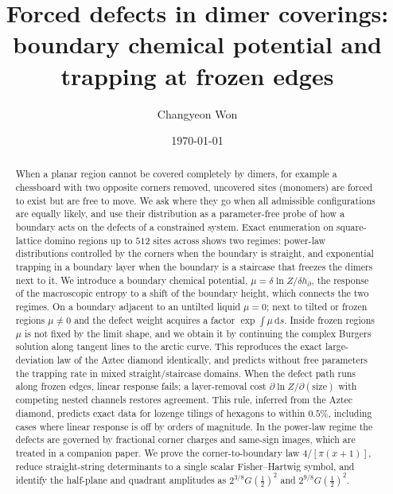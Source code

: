 \documentclass[aps,pre,twocolumn,superscriptaddress,nofootinbib,floatfix]{revtex4-2}
\newcommand{\dd}{\mathrm{d}}
\begin{document}
\title{Forced defects in dimer coverings:\\ boundary chemical potential and trapping at frozen edges}

\author{Changyeon Won}

\date{\today}

\begin{abstract}
When a planar region cannot be covered completely by dimers, for example a chessboard with two opposite corners removed, uncovered sites (monomers) are forced to exist but are free to move. We ask where they go when all admissible configurations are equally likely, and use their distribution as a parameter-free probe of how a boundary acts on the defects of a constrained system. Exact enumeration on square-lattice domino regions up to $512$ sites across shows two regimes: power-law distributions controlled by the corners when the boundary is straight, and exponential trapping in a boundary layer when the boundary is a staircase that freezes the dimers next to it. We introduce a boundary chemical potential, $\mu=\delta\ln Z/\delta h_\partial$, the response of the macroscopic entropy to a shift of the boundary height, which connects the two regimes. On a boundary adjacent to an untilted liquid $\mu=0$; next to tilted or frozen regions $\mu\neq0$ and the defect weight acquires a factor $\exp\int\mu\,\dd s$. Inside frozen regions $\mu$ is not fixed by the limit shape, and we obtain it by continuing the complex Burgers solution along tangent lines to the arctic curve. This reproduces the exact large-deviation law of the Aztec diamond identically, and predicts without free parameters the trapping rate in mixed straight/staircase domains. When the defect path runs along frozen edges, linear response fails; a layer-removal cost $\partial\ln Z/\partial(\text{size})$ with competing nested channels restores agreement. This rule, inferred from the Aztec diamond, predicts exact data for lozenge tilings of hexagons to within $0.5\%$, including cases where linear response is off by orders of magnitude. In the power-law regime the defects are governed by fractional corner charges and same-sign images, which are treated in a companion paper. We prove the corner-to-boundary law $4/[\pi(x+1)]$, reduce straight-string determinants to a single scalar Fisher--Hartwig symbol, and identify the half-plane and quadrant amplitudes as $2^{3/8}G(\tfrac12)^2$ and $2^{9/8}G(\tfrac12)^2$.
\end{abstract}
\end{document}

